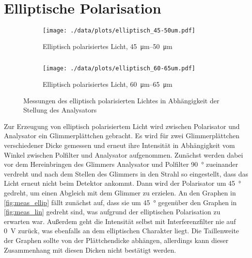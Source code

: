 \section{Elliptische Polarisation}
\begin{figure}[tb]
	\begin{subfigure}{.4\textwidth}
		\centering
		\texttt{[image: ./data/plots/elliptisch\_45-50um.pdf]}
		\caption[\SIrange{45}{50}{\micro\meter}]{Elliptisch polarisiertes Licht, \SIrange{45}{50}{\micro\meter}}
		\label{subfig:ellip_45_50}
	\end{subfigure}
	$\quad$
	\begin{subfigure}{.4\textwidth}
		\centering
		\texttt{[image: ./data/plots/elliptisch\_60-65um.pdf]}
		\caption[\SIrange{60}{65}{\micro\meter}]{Elliptisch polarisiertes Licht, \SIrange{60}{65}{\micro\meter}}
		\label{subfig:ellip_60_65}
	\end{subfigure}
	\caption[Elliptisch polarisiertes Licht]{Messungen des elliptisch polarisierten Lichtes in Abhängigkeit der Stellung des Analysators}
	\label{fig:meas_ellip}
\end{figure}
Zur Erzeugung von elliptisch polarisiertem Licht wird zwischen Polarisator und Analysator ein Glimmerplättchen gebracht.
Es wird für zwei Glimmerplättchen verschiedener Dicke gemessen und erneut ihre Intensität in Abhängigkeit vom Winkel zwischen Polfilter und Analysator aufgenommen.
Zunächst werden dabei vor dem Hereinbringen des Glimmers Analysator und Polfilter \SI{90}{\degree} zueinander verdreht und nach dem Stellen des Glimmers in den Strahl so eingestellt, dass das Licht erneut nicht beim Detektor ankommt.
Dann wird der Polarisator um \SI{45}{\degree} gedreht, um einen Abgleich mit dem Glimmer zu erzielen. 
An den Graphen in \autoref{fig:meas_ellip} fällt zunächst auf, dass sie um \SI{45}{\degree} gegenüber den Graphen in \autoref{fig:meas_lin} gedreht sind, was aufgrund der elliptischen Polarisation zu erwarten war.
Außerdem geht die Intensität selbst mit Interferenzfilter nie auf \SI{0}{\volt} zurück, was ebenfalls an dem elliptischen Charakter liegt.
Die Taillenweite der Graphen sollte von der Plättchendicke abhängen, allerdings kann dieser Zusammenhang mit diesen Dicken nicht bestätigt werden.
